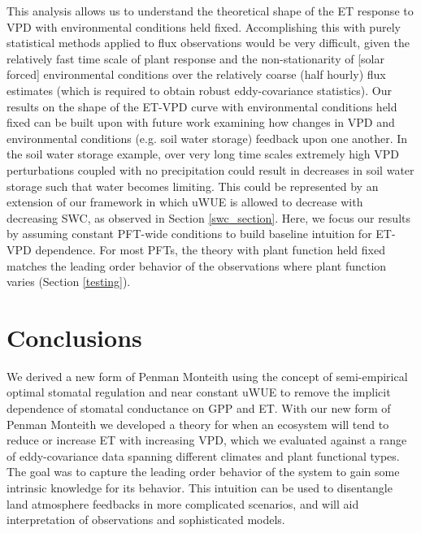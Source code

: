 \documentclass[draft,linenumbers]{afmjournal}
\begin{document}
This analysis allows us to understand the theoretical shape of the ET
response to VPD with environmental conditions held
fixed. Accomplishing this with purely statistical
methods applied to flux observations would be very difficult, given
the relatively fast time scale of plant response and the
non-stationarity of [solar forced] environmental conditions over the
relatively coarse (half hourly) flux estimates (which is required to
obtain robust eddy-covariance statistics). Our results on the shape of
the ET-VPD curve with environmental conditions held
fixed can be built upon with future work examining how changes in VPD
and environmental conditions (e.g. soil water storage) feedback upon
one another. In the soil water storage example, over very long time
scales extremely high VPD perturbations coupled with no precipitation
could result in decreases in soil water storage such that water
becomes limiting. This could be represented by an extension of our
framework in which uWUE is allowed to decrease with decreasing SWC, as
observed in Section \ref{swc_section}. Here, we focus our results by
assuming constant PFT-wide conditions to build baseline intuition for
ET-VPD dependence. For most PFTs, the theory with plant function held
fixed matches the leading order behavior of the observations where
plant function varies (Section \ref{testing}).

\section{Conclusions}

We derived a new form of Penman Monteith using the concept of
semi-empirical optimal stomatal regulation \citep{Lin_2015,
  MEDLYN_2011} and near constant uWUE \citep{Zhou_2015} to remove the
implicit dependence of stomatal conductance on GPP and ET. With our
new form of Penman Monteith we developed a theory for when an
ecosystem will tend to reduce or increase ET with increasing VPD,
which we evaluated against a range of eddy-covariance data spanning
different climates and plant functional types. The goal was to capture
the leading order behavior of the system to gain some intrinsic
knowledge for its behavior. This intuition can be used to disentangle
land atmosphere feedbacks in more complicated scenarios, and will aid
interpretation of observations and sophisticated models.
\end{document}
